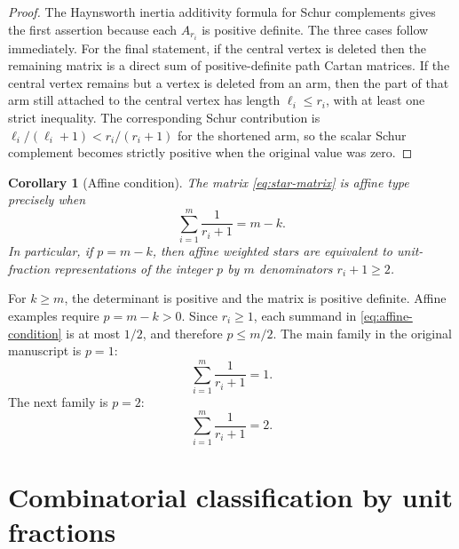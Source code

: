 \documentclass[11pt,a4paper]{article}
\theoremstyle{definition}
\theoremstyle{plain}
\newtheorem{corollary}[definition]{Corollary}
\begin{document}
\begin{proof}
The Haynsworth inertia additivity formula for Schur complements gives the first assertion because each $A_{r_i}$ is positive definite.  The three cases follow immediately.  For the final statement, if the central vertex is deleted then the remaining matrix is a direct sum of positive-definite path Cartan matrices.  If the central vertex remains but a vertex is deleted from an arm, then the part of that arm still attached to the central vertex has length $\ell_i\le r_i$, with at least one strict inequality.  The corresponding Schur contribution is $\ell_i/(\ell_i+1)<r_i/(r_i+1)$ for the shortened arm, so the scalar Schur complement becomes strictly positive when the original value was zero.
\end{proof}

\begin{corollary}[Affine condition]
The matrix \eqref{eq:star-matrix} is affine type precisely when
\begin{equation}
\sum_{i=1}^m \frac{1}{r_i+1}=m-k.
\label{eq:affine-condition}
\end{equation}
In particular, if $p=m-k$, then affine weighted stars are equivalent to unit-fraction representations of the integer $p$ by $m$ denominators $r_i+1\ge2$.
\end{corollary}

For $k\geq m$, the determinant is positive and the matrix is positive definite.  Affine examples require $p=m-k>0$.  Since $r_i\geq1$, each summand in \eqref{eq:affine-condition} is at most $1/2$, and therefore $p\le m/2$.  The main family in the original manuscript is $p=1$:
\begin{equation}
\sum_{i=1}^m \frac{1}{r_i+1}=1.
\label{eq:egyptian-one}
\end{equation}
The next family is $p=2$:
\begin{equation}
\sum_{i=1}^m \frac{1}{r_i+1}=2.
\label{eq:egyptian-two}
\end{equation}

\section{Combinatorial classification by unit fractions}
\label{sec:classification}
\end{document}
